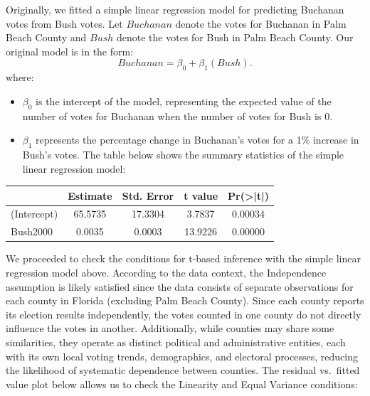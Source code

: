 \documentclass[
  letterpaper,
  DIV=11,
  numbers=noendperiod]{scrartcl}
\providecommand{\tightlist}{%
  \setlength{\itemsep}{0pt}\setlength{\parskip}{0pt}}\usepackage{longtable,booktabs,array}
\begin{document}
Originally, we fitted a simple linear regression model for predicting
Buchanan votes from Bush votes. Let \(Buchanan\) denote the votes for
Buchanan in Palm Beach County and \(Bush\) denote the votes for Bush in
Palm Beach County. Our original model is in the form:
\[Buchanan = \beta_0 + \beta_1\left(Bush\right).\] where:

\begin{itemize}
\tightlist
\item
  \(\beta_0\) is the intercept of the model, representing the expected
  value of the number of votes for Buchanan when the number of votes for
  Bush is 0.
\end{itemize}

\begin{itemize}
\tightlist
\item
  \(\beta_1\) represents the percentage change in Buchanan's votes for a
  1\% increase in Bush's votes. The table below shows the summary
  statistics of the simple linear regression model:
\end{itemize}

\begin{table}[H]
\centering
\begin{tabular}[t]{lcccc}
\toprule
  & Estimate & Std. Error & t value & Pr(>|t|)\\
\midrule
(Intercept) & 65.5735 & 17.3304 & 3.7837 & 0.00034\\
Bush2000 & 0.0035 & 0.0003 & 13.9226 & 0.00000\\
\bottomrule
\end{tabular}
\end{table}

We proceeded to check the conditions for t-based inference with the
simple linear regression model above. According to the data context, the
Independence assumption is likely satisfied since the data consists of
separate observations for each county in Florida (excluding Palm Beach
County). Since each county reports its election results independently,
the votes counted in one county do not directly influence the votes in
another. Additionally, while counties may share some similarities, they
operate as distinct political and administrative entities, each with its
own local voting trends, demographics, and electoral processes, reducing
the likelihood of systematic dependence between counties. The residual
vs.~fitted value plot below allows us to check the Linearity and Equal
Variance conditions:
\end{document}
